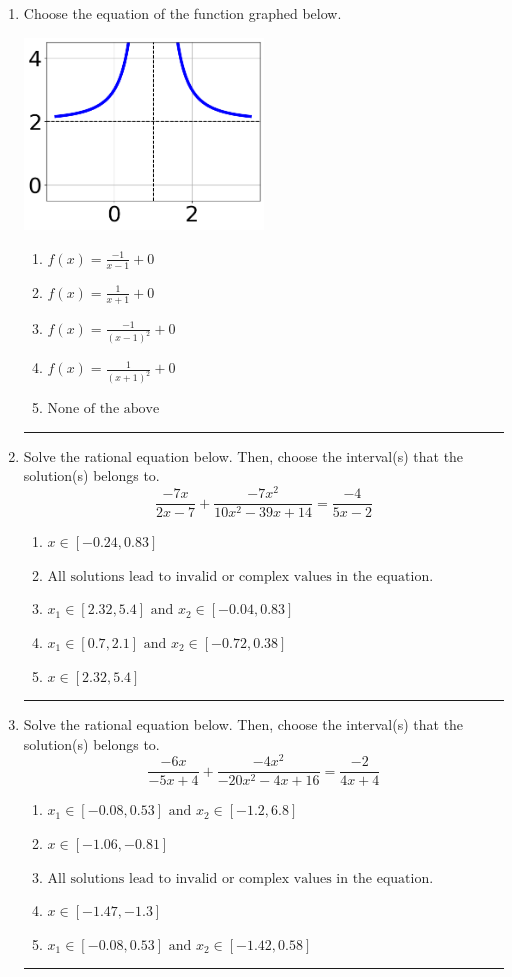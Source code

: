 \documentclass[14pt]{extbook}
\newcommand{\litem}[1]{\item#1\hspace*{-1cm}\rule{\textwidth}{0.4pt}}
\begin{document}
\begin{enumerate}
{\begin{enumerate}[label=\Alph*.]
\end{enumerate} }
\litem{
Choose the equation of the function graphed below.
\begin{center}
    \includegraphics[width=0.5\textwidth]{../Figures/rationalGraphToEquationC.png}
\end{center}
\begin{enumerate}[label=\Alph*.]
\item \( f(x) = \frac{-1}{x - 1} + 0 \)
\item \( f(x) = \frac{1}{x + 1} + 0 \)
\item \( f(x) = \frac{-1}{(x - 1)^2} + 0 \)
\item \( f(x) = \frac{1}{(x + 1)^2} + 0 \)
\item \( \text{None of the above} \)

\end{enumerate} }
\litem{
Solve the rational equation below. Then, choose the interval(s) that the solution(s) belongs to.\[ \frac{-7x}{2x -7} + \frac{-7x^{2}}{10x^{2} -39 x + 14} = \frac{-4}{5x -2} \]\begin{enumerate}[label=\Alph*.]
\item \( x \in [-0.24,0.83] \)
\item \( \text{All solutions lead to invalid or complex values in the equation.} \)
\item \( x_1 \in [2.32, 5.4] \text{ and } x_2 \in [-0.04,0.83] \)
\item \( x_1 \in [0.7, 2.1] \text{ and } x_2 \in [-0.72,0.38] \)
\item \( x \in [2.32,5.4] \)

\end{enumerate} }
\litem{
Solve the rational equation below. Then, choose the interval(s) that the solution(s) belongs to.\[ \frac{-6x}{-5x + 4} + \frac{-4x^{2}}{-20x^{2} -4 x + 16} = \frac{-2}{4x + 4} \]\begin{enumerate}[label=\Alph*.]
\item \( x_1 \in [-0.08, 0.53] \text{ and } x_2 \in [-1.2,6.8] \)
\item \( x \in [-1.06,-0.81] \)
\item \( \text{All solutions lead to invalid or complex values in the equation.} \)
\item \( x \in [-1.47,-1.3] \)
\item \( x_1 \in [-0.08, 0.53] \text{ and } x_2 \in [-1.42,0.58] \)

\end{enumerate} }
\end{enumerate}
\end{document}
